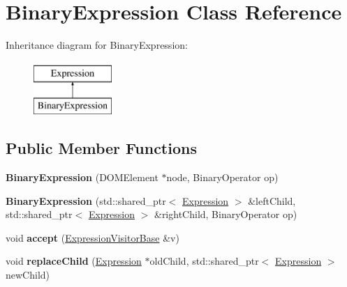 \hypertarget{class_binary_expression}{\section{Binary\+Expression Class Reference}
\label{class_binary_expression}
}
Inheritance diagram for Binary\+Expression\+:\begin{figure}[H]
\begin{center}
\leavevmode
\includegraphics[height=2.000000cm]{class_binary_expression}
\end{center}
\end{figure}
\subsection*{Public Member Functions}
\begin{DoxyCompactItemize}
\item 
\hypertarget{class_binary_expression_a5d19c8f759e63c10af90f1951b5a760d}{{\bfseries Binary\+Expression} (D\+O\+M\+Element $\ast$node, Binary\+Operator op)}\label{class_binary_expression_a5d19c8f759e63c10af90f1951b5a760d}

\item 
\hypertarget{class_binary_expression_af3c15a9d05697963ebac1e010e894c04}{{\bfseries Binary\+Expression} (std\+::shared\+\_\+ptr$<$ \hyperlink{class_expression}{Expression} $>$ \&left\+Child, std\+::shared\+\_\+ptr$<$ \hyperlink{class_expression}{Expression} $>$ \&right\+Child, Binary\+Operator op)}\label{class_binary_expression_af3c15a9d05697963ebac1e010e894c04}

\item 
\hypertarget{class_binary_expression_a12ea9a0735a8809b01059988b6466d7c}{void {\bfseries accept} (\hyperlink{class_expression_visitor_base}{Expression\+Visitor\+Base} \&v)}\label{class_binary_expression_a12ea9a0735a8809b01059988b6466d7c}

\item 
\hypertarget{class_binary_expression_a7ff9236432aef24bca655ab45cf475f2}{void {\bfseries replace\+Child} (\hyperlink{class_expression}{Expression} $\ast$old\+Child, std\+::shared\+\_\+ptr$<$ \hyperlink{class_expression}{Expression} $>$ new\+Child)}\label{class_binary_expression_a7ff9236432aef24bca655ab45cf475f2}

\end{DoxyCompactItemize}

